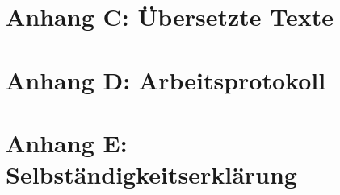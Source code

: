 \documentclass{article}
\begin{document}
\section{Anhang C: Übersetzte Texte}


\section{Anhang D: Arbeitsprotokoll}


\section{Anhang E: \\Selbständigkeitserklärung}

\end{document}
